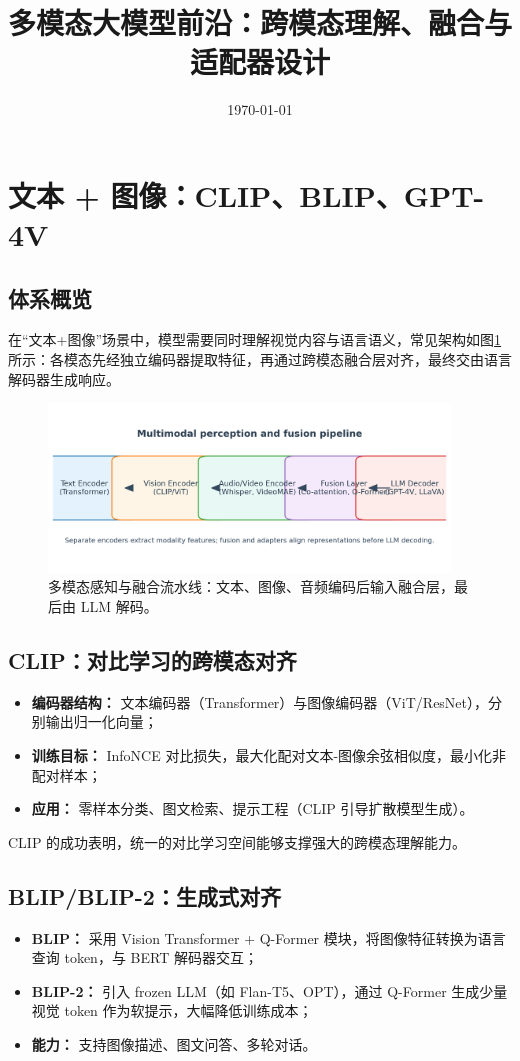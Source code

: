 \documentclass[UTF8,zihao=-4]{ctexart}
\title{多模态大模型前沿：跨模态理解、融合与适配器设计}
\author{}
\date{\today}
\begin{document}
\maketitle

\section{文本 + 图像：CLIP、BLIP、GPT-4V}
\subsection{体系概览}
在“文本+图像”场景中，模型需要同时理解视觉内容与语言语义，常见架构如图\ref{fig:multimodal_pipeline_cn} 所示：各模态先经独立编码器提取特征，再通过跨模态融合层对齐，最终交由语言解码器生成响应。
\begin{figure}[H]
  \centering
  \includegraphics[width=0.95\textwidth]{multimodal_pipeline.png}
  \caption{多模态感知与融合流水线：文本、图像、音频编码后输入融合层，最后由 LLM 解码。}
  \label{fig:multimodal_pipeline_cn}
\end{figure}

\subsection{CLIP：对比学习的跨模态对齐}
\begin{itemize}
  \item \textbf{编码器结构：} 文本编码器（Transformer）与图像编码器（ViT/ResNet），分别输出归一化向量；
  \item \textbf{训练目标：} InfoNCE 对比损失，最大化配对文本-图像余弦相似度，最小化非配对样本；
  \item \textbf{应用：} 零样本分类、图文检索、提示工程（CLIP 引导扩散模型生成）。
\end{itemize}
CLIP 的成功表明，统一的对比学习空间能够支撑强大的跨模态理解能力。

\subsection{BLIP/BLIP-2：生成式对齐}
\begin{itemize}
  \item \textbf{BLIP：} 采用 Vision Transformer + Q-Former 模块，将图像特征转换为语言查询 token，与 BERT 解码器交互；
  \item \textbf{BLIP-2：} 引入 frozen LLM（如 Flan-T5、OPT），通过 Q-Former 生成少量视觉 token 作为软提示，大幅降低训练成本；
  \item \textbf{能力：} 支持图像描述、图文问答、多轮对话。
\end{itemize}
\end{document}

